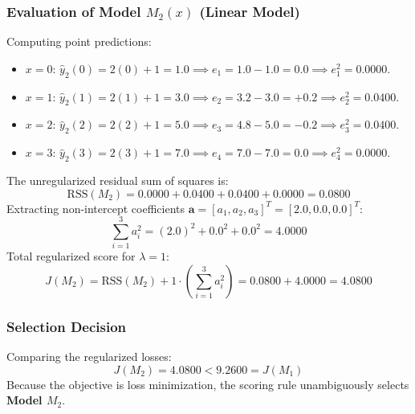 \documentclass[11pt,a4paper]{article}
\theoremstyle{definition}
\theoremstyle{plain}
\theoremstyle{remark}
\begin{document}
\subsubsection{Evaluation of Model \texorpdfstring{$M_2(x)$}{M2(x)} (Linear Model)}
Computing point predictions:
\begin{itemize}[noitemsep]
    \item $x=0$: $\hat{y}_2(0) = 2(0) + 1 = 1.0 \implies e_1 = 1.0 - 1.0 = 0.0 \implies e_1^2 = 0.0000$.
    \item $x=1$: $\hat{y}_2(1) = 2(1) + 1 = 3.0 \implies e_2 = 3.2 - 3.0 = +0.2 \implies e_2^2 = 0.0400$.
    \item $x=2$: $\hat{y}_2(2) = 2(2) + 1 = 5.0 \implies e_3 = 4.8 - 5.0 = -0.2 \implies e_3^2 = 0.0400$.
    \item $x=3$: $\hat{y}_2(3) = 2(3) + 1 = 7.0 \implies e_4 = 7.0 - 7.0 = 0.0 \implies e_4^2 = 0.0000$.
\end{itemize}
The unregularized residual sum of squares is:
\begin{equation}
\text{RSS}(M_2) = 0.0000 + 0.0400 + 0.0400 + 0.0000 = \mathbf{0.0800}
\end{equation}
Extracting non-intercept coefficients $\mathbf{a} = [a_1, a_2, a_3]^T = [2.0, 0.0, 0.0]^T$:
\begin{equation}
\sum_{i=1}^3 a_i^2 = (2.0)^2 + 0.0^2 + 0.0^2 = \mathbf{4.0000}
\end{equation}
Total regularized score for $\lambda = 1$:
\begin{equation}
J(M_2) = \text{RSS}(M_2) + 1 \cdot \left(\sum_{i=1}^3 a_i^2\right) = 0.0800 + 4.0000 = \mathbf{4.0800}
\end{equation}

\subsubsection{Selection Decision}
Comparing the regularized losses:
\begin{equation}
J(M_2) = 4.0800 < 9.2600 = J(M_1)
\end{equation}
Because the objective is loss minimization, the scoring rule unambiguously selects \textbf{Model $M_2$}.
\end{document}

